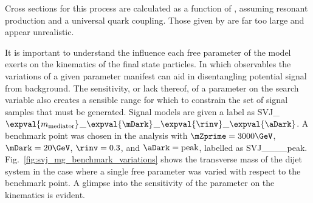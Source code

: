 Cross sections for this process are calculated as a function of \mZprime, assuming resonant production and a universal quark coupling. Those given by \MADGRAPH are far too large and appear unrealistic. %

It is important to understand the influence each free parameter of the model exerts on the kinematics of the final state particles. In which observables the variations of a given parameter manifest can aid in disentangling potential signal from background. The sensitivity, or lack thereof, of a parameter on the search variable also creates a sensible range for which to constrain the set of signal samples that must be generated. Signal models are given a label as SVJ\_\-$\expval{m_{\mathrm{mediator}}}$\_\-$\expval{\mDark}$\_\-$\expval{\rinv}$\_\-$\expval{\aDark}$. A benchmark point was chosen in the analysis with $\mZprime = \text{3000}\GeV$, $\mDark = \text{20}\GeV$, $\rinv = \text{0.3}$, and $\aDark = \text{peak}$, labelled as SVJ\_\_\_\_\-peak. Fig.~\ref{fig:svj_mg_benchmark_variations} shows the transverse mass of the dijet system \mT in the case where a single free parameter was varied with respect to the benchmark point. A glimpse into the sensitivity of the parameter on the kinematics is evident.


